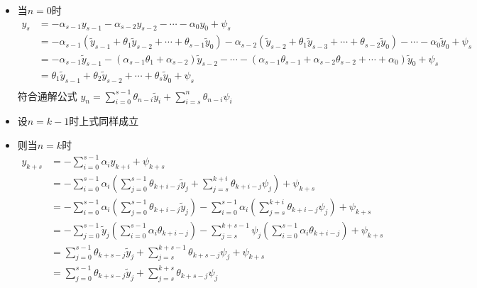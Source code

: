 \documentclass[a4paper]{article}
\begin{document}
\begin{itemize}
    \item 当$n=0$时 
            \begin{equation}
                \begin{aligned}
                    y_s &= -\alpha_{s-1}y_{s-1} - \alpha_{s-2}y_{s-2} - \cdots - \alpha_0y_0 + \psi_{s}\\
                        &= -\alpha_{s-1}(\tilde{y}_{s-1}+\theta_1\tilde{y}_{s-2}+\cdots+\theta_{s-1}\tilde{y}_{0}) 
                        - \alpha_{s-2}(\tilde{y}_{s-2}+\theta_1\tilde{y}_{s-3}+\cdots+\theta_{s-2}\tilde{y}_{0}) - \cdots - \alpha_0
                        \tilde{y}_0 + \psi_{s}\\
                        &= -\alpha_{s-1}\tilde{y}_{s-1} - (\alpha_{s-1}\theta_1+\alpha_{s-2})\tilde{y}_{s-2} - \cdots -
                        (\alpha_{s-1}\theta_{s-1}+\alpha_{s-2}\theta_{s-2}+\cdots+\alpha_{0})\tilde{y}_0 + \psi_{s}\\
                        &= \theta_1\tilde{y}_{s-1} +\theta_2\tilde{y}_{s-2} + \cdots +
                        \theta_s\tilde{y}_0 + \psi_{s}\\
                \end{aligned}
            \end{equation}
            符合通解公式 $y_n=\displaystyle
            \sum_{i=0}^{s-1} \theta_{n-i} \tilde{y}_{i} + \displaystyle\sum_{i=s}^{n}\theta_{n-i}\psi_i$
    \item 设$n=k-1$时上式同样成立
    \item 则当$n=k$时
            \begin{equation}
                \begin{aligned}
                    y_{k+s} &= -\sum_{i=0}^{s-1}\alpha_i y_{k+i} +\psi_{k+s}\\
                    &=-\sum_{i=0}^{s-1}\alpha_i \left(\sum_{j=0}^{s-1} \theta_{k+i-j}\tilde{
                        y}_j + \sum_{j=s}^{k+i}\theta_{k+i-j}\psi_j\right) + \psi_{k+s}\\
                    &=-\sum_{i=0}^{s-1}\alpha_i \left(\sum_{j=0}^{s-1} \theta_{k+i-j}\tilde{
                        y}_j\right) - \sum_{i=0}^{s-1}\alpha_i \left(\sum_{j=s}^{k+i}\theta_{k+i-j}\psi_j\right) + \psi_{k+s}\\
                    &=-\sum_{j=0}^{s-1} \tilde{y}_j\left(\sum_{i=0}^{s-1} \alpha_i\theta_{k+i-j}\right) 
                        - \sum_{j=s}^{k+s-1} \psi_j\left(\sum_{i=0}^{s-1}\alpha_i\theta_{k+i-j}\right) + \psi_{k+s}\\
                    &=\sum_{j=0}^{s-1} \theta_{k+s-j}\tilde{y}_j + \sum_{j=s}^{k+s-1} \theta_{k+s-j}\psi_j + \psi_{k+s}\\
                    &=\sum_{j=0}^{s-1} \theta_{k+s-j}\tilde{y}_j + \sum_{j=s}^{k+s} \theta_{k+s-j}\psi_j
                \end{aligned}
            \end{equation}
\end{itemize}
\end{document}
